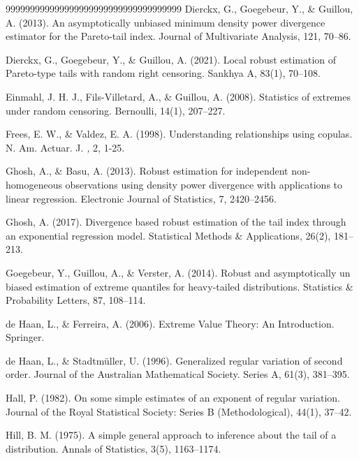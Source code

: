 \documentclass[reqno,openbib,runningheads,a4paper,12pt]{amsart}%
\begin{document}
\begin{thebibliography}{999999999999999999999999999999999999}
Dierckx, G., Goegebeur, Y., \&
Guillou, A. (2013). An asymptotically unbiased minimum density power
divergence estimator for the Pareto-tail index. Journal of Multivariate
Analysis, 121, 70--86.

Dierckx, G., Goegebeur, Y., \&
Guillou, A. (2021). Local robust estimation of Pareto-type tails with random
right censoring. Sankhya A, 83(1), 70--108.

Einmahl, J. H. J.,
Fils-Villetard, A., \& Guillou, A. (2008). Statistics of extremes under random
censoring. Bernoulli, 14(1), 207--227.

Frees, E. W., \& Valdez, E. A. (1998).
Understanding relationships using copulas. N. Am. Actuar. J. \textit{,} 2, 1-25.

Ghosh, A., \& Basu, A. (2013). Robust
estimation for independent non-homogeneous observations using density power
divergence with applications to linear regression. Electronic Journal of
Statistics, 7, 2420--2456.

Ghosh, A. (2017). Divergence based robust
estimation of the tail index through an exponential regression model.
Statistical Methods \& Applications, 26(2), 181--213.

Goegebeur, Y., Guillou, A.,
\& Verster, A. (2014). Robust and asymptotically un biased estimation of
extreme quantiles for heavy-tailed distributions. Statistics \& Probability
Letters, 87, 108--114.

de Haan, L., \& Ferreira, A.
(2006). Extreme Value Theory: An Introduction. Springer.

de Haan, L., \&
Stadtm\"{u}ller, U. (1996). Generalized regular variation of second order.
Journal of the Australian Mathematical Society. Series A, 61(3), 381--395.

Hall, P. (1982). On some simple estimates of an
exponent of regular variation. Journal of the Royal Statistical Society:
Series B (Methodological), 44(1), 37--42.

Hill, B. M. (1975). A simple general approach to
inference about the tail of a distribution. Annals of Statistics, 3(5), 1163--1174.


\end{thebibliography}
\end{document}
